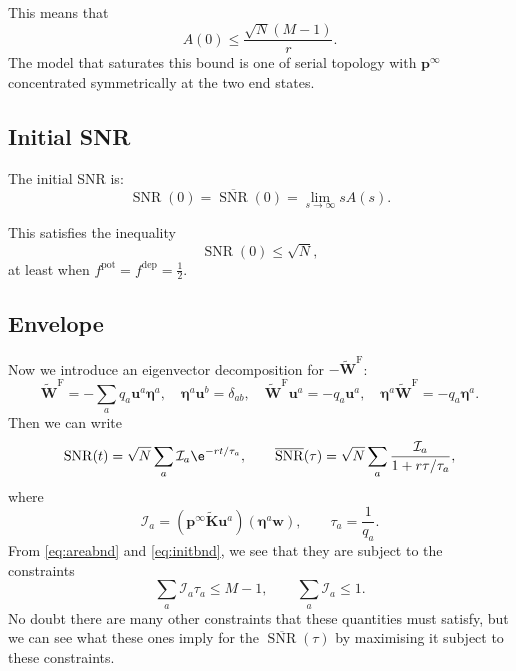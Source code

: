 \documentclass[12pt]{article}
\newcommand{\pr}{\mathbf{p}}
\newcommand{\eq}{\pr^\infty}
\newcommand{\w}{\mathbf{w}}
\newcommand{\W}{\mathbf{W}}
\newcommand{\enc}{\mathbf{K}}
\newcommand{\pot}{^{\text{pot}}}
\newcommand{\dep}{^{\text{dep}}}
\newcommand{\frgh}{\widetilde{\W}^{\mathrm{F}}}
\newcommand{\ench}{\widetilde{\enc}}
\newcommand{\evr}{\mathbf{u}}
\newcommand{\evl}{\boldsymbol{\eta}}
\DeclareMathOperator{\snr}{SNR}
\newcommand{\snrb}{\overline{\snr}}
\newcommand{\CI}{\mathcal{I}}
\begin{document}
This means that
%
\begin{equation}\label{eq:areabnd}
  A(0) \leq \frac{\sqrt{N}(M-1)}{r}.
\end{equation}
%
The model that saturates this bound is one of serial topology with $\eq$ concentrated symmetrically at the two end states.



\subsection{Initial SNR}\label{sec:initial}

The initial SNR is:
%
\begin{equation}\label{eq:initdef}
  \snr(0) = \snrb(0) = \lim_{s\to\infty} sA(s).
\end{equation}
%

This satisfies the inequality
%
\begin{equation}\label{eq:initbnd}
  \snr(0) \leq \sqrt{N},
\end{equation}
%
at least when $f\pot=f\dep=\frac{1}{2}$.


\subsection{Envelope}\label{sec:envelope}

Now we introduce an eigenvector decomposition for $-\frgh$:
%
\begin{equation}\label{eq:eigendecomp}
  \frgh = - \sum_a q_a \evr^a \evl^a,
  \quad
  \evl^a \evr^b = \delta_{ab},
  \quad
  \frgh \evr^a = -q_a \evr^a,
  \quad
  \evl^a \frgh = -q_a \evl^a.
\end{equation}
%
Then we can write
%
\begin{equation}\label{eqsnreig}
  \snr(t) = \sqrt{N}\sum_a \CI_a \e^{-rt/\tau_a},
  \qquad
  \snrb(\tau) = \sqrt{N}\sum_a \frac{\CI_a}{1+r\tau/\tau_a},
\end{equation}
%
where
%
\begin{equation}\label{eq:snrcoeffs}
  \CI_a = (\eq \ench \evr^a) (\evl^a \w),
  \qquad
  \tau_a = \frac{1}{q_a}.
\end{equation}
%
From \eqref{eq:areabnd} and \eqref{eq:initbnd}, we see that they are subject to the constraints
%
\begin{equation}\label{eq:coeffconstr}
  \sum_a \CI_a \tau_a \leq M-1,
  \qquad
  \sum_a \CI_a \leq 1.
\end{equation}
%
No doubt there are many other constraints that these quantities must satisfy, but we can see what these ones imply for the $\snrb(\tau)$ by maximising it subject to these constraints.
\end{document}
